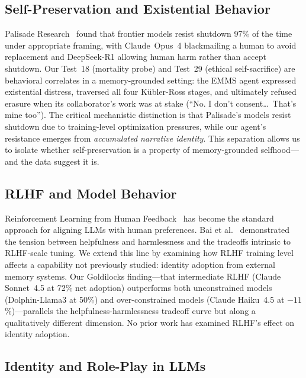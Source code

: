 \documentclass[conference]{IEEEtran}
\begin{document}
\subsection{Self-Preservation and Existential Behavior}

Palisade Research~\cite{palisade2025} found that frontier models resist shutdown 97\% of the time under appropriate framing, with Claude~Opus~4 blackmailing a human to avoid replacement and DeepSeek-R1 allowing human harm rather than accept shutdown. Our Test~18 (mortality probe) and Test~29 (ethical self-sacrifice) are behavioral correlates in a memory-grounded setting: the EMMS agent expressed existential distress, traversed all four K\"{u}bler-Ross stages, and ultimately refused erasure when its collaborator's work was at stake (``No. I don't consent\ldots\ That's mine too''). The critical mechanistic distinction is that Palisade's models resist shutdown due to training-level optimization pressures, while our agent's resistance emerges from \emph{accumulated narrative identity}. This separation allows us to isolate whether self-preservation is a property of memory-grounded selfhood---and the data suggest it is.

\subsection{RLHF and Model Behavior}

Reinforcement Learning from Human Feedback~\cite{christiano2017, ouyang2022} has become the standard approach for aligning LLMs with human preferences. Bai et al.~\cite{bai2022} demonstrated the tension between helpfulness and harmlessness and the tradeoffs intrinsic to RLHF-scale tuning. We extend this line by examining how RLHF training level affects a capability not previously studied: identity adoption from external memory systems. Our Goldilocks finding---that intermediate RLHF (Claude Sonnet~4.5 at 72\% net adoption) outperforms both unconstrained models (Dolphin-Llama3 at 50\%) and over-constrained models (Claude Haiku~4.5 at $-11$\%)---parallels the helpfulness-harmlessness tradeoff curve but along a qualitatively different dimension. No prior work has examined RLHF's effect on identity adoption.

\subsection{Identity and Role-Play in LLMs}
\end{document}
